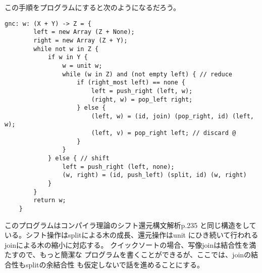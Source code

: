 	この手順をプログラムにすると次のようになるだろう。
	\begin{lstlisting}[caption=二分木を左から辿るgnc, label=code:二分木を左から辿るgnc]
	gnc: w: (X + Y) -> Z = {
		left = new Array (Z + None);
		right = new Array (Z + Y);
		while not w in Z {
			if w in Y {
				w = unit w;
				while (w in Z) and (not empty left) { // reduce
					if (right_most left) == none {
						left = push_right (left, w);
						(right, w) = pop_left right;
					} else {
						(left, w) = (id, join) (pop_right, id) (left, w);
						(left, v) = pop_right left; // discard @
					}
				}
			} else { // shift
				left = push_right (left, none);
				(w, right) = (id, push_left) (split, id) (w, right)
			}
		}
		return w;
	}
	\end{lstlisting}
	このプログラムはコンパイラ理論のシフト還元構文解析\cite{aho:dragon}p.235
	と同じ構造をしている。シフト操作はsplitによる木の成長、還元操作はunit
	にひき続いて行われるjoinによる木の縮小に対応する。
	クイックソートの場合、写像joinは結合性を満たすので、もっと簡潔な
	プログラムを書くことができるが、ここでは、joinの結合性もsplitの余結合性
	も仮定しないで話を進めることにする。

